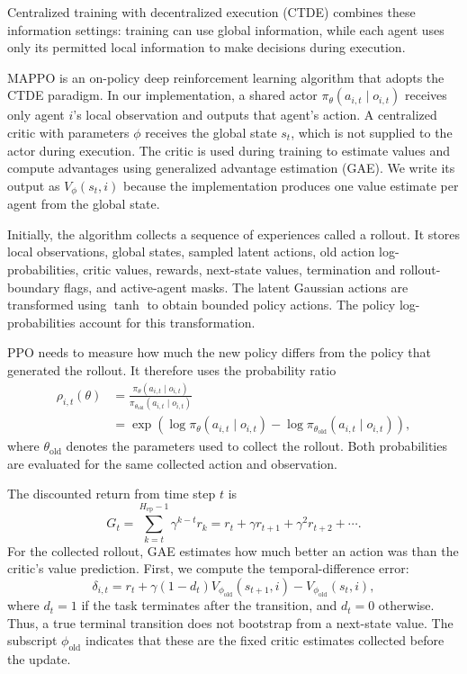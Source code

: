 \documentclass[11pt]{article}
\begin{document}
Centralized training with decentralized execution (CTDE) combines these
information settings: training can use global information, while each agent
uses only its permitted local information to make decisions during execution.

MAPPO is an on-policy deep reinforcement learning algorithm that adopts
the CTDE paradigm. In our implementation, a shared actor
$\pi_\theta(a_{i,t}\mid o_{i,t})$ receives only agent $i$'s local
observation and outputs that agent's action. A centralized critic with
parameters $\phi$ receives the global state $s_t$, which is not supplied
to the actor during execution. The critic is used during training to
estimate values and compute advantages using generalized advantage
estimation (GAE). We write its output as $V_\phi(s_t,i)$ because the
implementation produces one value estimate per agent from the global state.

Initially, the algorithm collects a sequence of experiences called a
rollout. It stores local observations, global states, sampled latent actions,
old action log-probabilities, critic values, rewards, next-state values,
termination and rollout-boundary flags, and active-agent masks. The latent
Gaussian actions are transformed using $\tanh$ to obtain bounded policy
actions. The policy log-probabilities account for this transformation.

PPO needs to measure how much the new policy differs from the policy that
generated the rollout. It therefore uses the probability ratio
\begin{align}
    \rho_{i,t}(\theta)
    &= \frac{\pi_\theta(a_{i,t}\mid o_{i,t})}
            {\pi_{\theta_{\mathrm{old}}}(a_{i,t}\mid o_{i,t})}
       \label{eq:probability-ratio} \\
    &= \exp\!\left(
        \log\pi_\theta(a_{i,t}\mid o_{i,t})
        -\log\pi_{\theta_{\mathrm{old}}}(a_{i,t}\mid o_{i,t})
       \right),
\end{align}
where $\theta_{\mathrm{old}}$ denotes the parameters used to collect the
rollout. Both probabilities are evaluated for the same collected action
and observation.

The discounted return from time step $t$ is
\begin{equation}
    G_t
    = \sum_{k=t}^{H_{\mathrm{ep}}-1}\gamma^{k-t}r_k
    = r_t + \gamma r_{t+1} + \gamma^2 r_{t+2} + \cdots.
    \label{eq:discounted-return}
\end{equation}
For the collected rollout, GAE estimates how much better an action was
than the critic's value prediction. First, we compute the temporal-difference
error:
\begin{equation}
    \delta_{i,t}
    = r_t
      + \gamma(1-d_t)V_{\phi_{\mathrm{old}}}(s_{t+1},i)
      - V_{\phi_{\mathrm{old}}}(s_t,i),
    \label{eq:td-error}
\end{equation}
where $d_t=1$ if the task terminates after the transition, and $d_t=0$
otherwise. Thus, a true terminal transition does not bootstrap from a
next-state value. The subscript $\phi_{\mathrm{old}}$ indicates that
these are the fixed critic estimates collected before the update.
\end{document}
